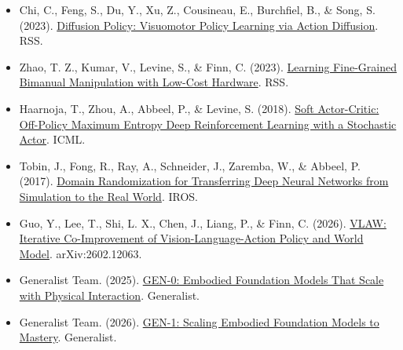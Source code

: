 \vspace{0.25em}
\begin{itemize}
\tightlist
\item
  Chi, C., Feng, S., Du, Y., Xu, Z., Cousineau, E., Burchfiel, B., \& Song, S. (2023). \href{https://arxiv.org/abs/2303.04137}{Diffusion Policy: Visuomotor Policy Learning via Action Diffusion}. RSS.
\item
  Zhao, T. Z., Kumar, V., Levine, S., \& Finn, C. (2023). \href{https://arxiv.org/abs/2304.13705}{Learning Fine-Grained Bimanual Manipulation with Low-Cost Hardware}. RSS.
\item
  Haarnoja, T., Zhou, A., Abbeel, P., \& Levine, S. (2018). \href{https://proceedings.mlr.press/v80/haarnoja18b.html}{Soft Actor-Critic: Off-Policy Maximum Entropy Deep Reinforcement Learning with a Stochastic Actor}. ICML.
\item
  Tobin, J., Fong, R., Ray, A., Schneider, J., Zaremba, W., \& Abbeel, P. (2017). \href{https://arxiv.org/abs/1703.06907}{Domain Randomization for Transferring Deep Neural Networks from Simulation to the Real World}. IROS.
\item
  Guo, Y., Lee, T., Shi, L. X., Chen, J., Liang, P., \& Finn, C. (2026). \href{https://arxiv.org/abs/2602.12063}{VLAW: Iterative Co-Improvement of Vision-Language-Action Policy and World Model}. arXiv:2602.12063.
\item
  Generalist Team. (2025). \href{https://generalistai.com/blog/gen-0}{GEN-0: Embodied Foundation Models That Scale with Physical Interaction}. Generalist.
\item
  Generalist Team. (2026). \href{https://generalistai.com/blog/gen-1}{GEN-1: Scaling Embodied Foundation Models to Mastery}. Generalist.
\end{itemize}

\clearpage
